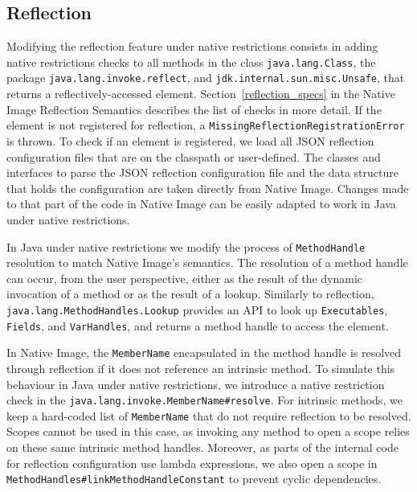 \subsection{Reflection}
Modifying the reflection feature under native restrictions consists in adding native restrictions checks to all methods in the class \verb|java.lang.Class|, the package \verb|java.lang.invoke.reflect|, and \verb|jdk.internal.sun.misc.Unsafe|, that returns a reflectively-accessed element. Section~\ref{reflection_specs} in the Native Image Reflection Semantics describes the list of checks in more detail. 
If the element is not registered for reflection, a \verb|MissingReflectionRegistrationError| is thrown.
To check if an element is registered, we load all JSON reflection configuration files that are on the classpath or user-defined. The classes and interfaces to parse the JSON reflection configuration file and the data structure that holds the configuration are taken directly from Native Image. Changes made to that part of the code in Native Image can be easily adapted to work in Java under native restrictions.

In Java under native restrictions we modify the process of \verb|MethodHandle| resolution to match Native Image's semantics.
The resolution of a method handle can occur, from the user perspective, either as the result of the dynamic invocation of a method or as the result of a lookup.
Similarly to reflection, \verb|java.lang.MethodHandles.Lookup| provides an API to look up \verb|Executables|, \verb|Fields|, and \verb|VarHandles|, and returns a method handle to access the element. 

In Native Image, the \verb|MemberName| encapsulated in the method handle is resolved through reflection if it does not reference an intrinsic method. To simulate this behaviour in Java under native restrictions, we introduce a native restriction check in the \verb|java.lang.invoke.MemberName#resolve|. 
For intrinsic methods, we keep a hard-coded list of \verb|MemberName| that do not require reflection to be resolved. Scopes cannot be used in this case, as invoking any method to open a scope relies on these same intrinsic method handles.
Moreover, as parts of the internal code for reflection configuration use lambda expressions, we also open a scope in \verb|MethodHandles#linkMethodHandleConstant| to prevent cyclic dependencies.

